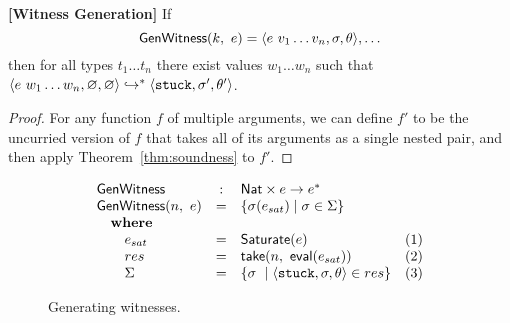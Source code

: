 \begin{cor}{\textbf{[Witness Generation]}}
\label{thm:generation}
  If $$\mathsf{GenWitness}(k,\ e) = \langle e\ v_1 \ldots v_n, \sigma, \theta \rangle,\ldots$$
  then for all types $t_1 \ldots t_n$ there exist values $w_1 \ldots w_n$ such that
  $\langle e\ w_1 \ldots w_n, \varnothing, \varnothing \rangle \hookrightarrow^{*} \langle \mathtt{stuck}, \sigma', \theta' \rangle{}$.
\end{cor}
\begin{proof}
  For any function $f$ of multiple arguments, we can define $f'$ to be
  the uncurried version of $f$ that takes all of its arguments as a single
  nested pair, and then apply Theorem~\ref{thm:soundness} to $f'$.
\end{proof}

\begin{figure}[t]
\centering
$$
\begin{array}{lclr}
\mathsf{GenWitness}       & : & \mathsf{Nat} \times e \rightarrow e^{*} & \\
\mathsf{GenWitness}(n,\ e)  & = & \{ \sigma(e_{sat}) \mid \sigma \in \Sigma \} & \\
\quad \mbox{\textbf{where}} &    & & \\
\quad \quad e_{sat} & = & \mathsf{Saturate}(e) & (1) \\
\quad \quad res    & = & \mathsf{take}(n,\ \mathsf{eval}(e_{sat})) & (2) \\
\quad \quad \Sigma & = & \{ \sigma\ \mid \langle \mathtt{stuck}, \sigma, \theta \rangle \in res\} & (3)
\end{array}
$$
\caption{Generating witnesses.}
\label{fig:algo-gen-witness}
\end{figure}

